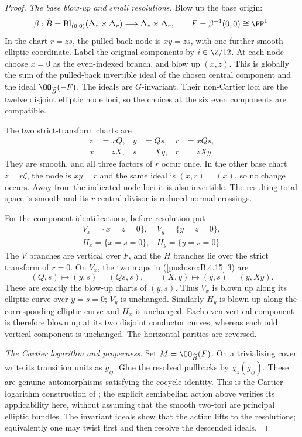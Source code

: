 \begin{proof}
\emph{The base blow-up and small resolutions.}
Blow up the base origin:
\[
 \beta:\widetilde B=\operatorname{Bl}_{(0,0)}
            (\Delta_z\times\Delta_r)
       \longrightarrow\Delta_z\times\Delta_r,
 \qquad F=\beta^{-1}(0,0)\cong\PP^1.
\]
In the chart $r=zs$, the pulled-back node is
$xy=zs$, with one further smooth elliptic coordinate.
Label the original components by $i\in\Z/12$.
At each node choose $x=0$ as the even-indexed branch,
and blow up $(x,z)$. This is globally the sum of the
pulled-back invertible ideal of the chosen central
component and the ideal $\OO_{\widetilde B}(-F)$.
The ideals are $G$-invariant. Their non-Cartier loci are
the twelve disjoint elliptic node loci, so the choices
at the six even components are compatible.

The two strict-transform charts are
\[
 \begin{aligned}
 z&=xQ,&y&=Qs,&r&=xQs,\\
 x&=zX,&s&=Xy,&r&=zXy.
 \end{aligned}
 \tag{B.4.15.3}
\]
They are smooth, and all three factors of $r$ occur once.
In the other base chart $z=r\zeta$, the node is $xy=r$
and the same ideal is $(x,r)=(x)$, so no change occurs.
Away from the indicated node loci it is also invertible.
The resulting total space is smooth and its $r$-central
divisor is reduced normal crossings.

For the component identifications, before resolution put
\[
 \begin{array}{ll}
 V_x=\{x=z=0\},&V_y=\{y=z=0\},\\
 H_x=\{x=s=0\},&H_y=\{y=s=0\}.
 \end{array}
\]
The $V$ branches are vertical over $F$, and the $H$
branches lie over the strict transform of $r=0$.
On $V_x$, the two maps in (\ref{push:src:B.4.15}.3) are
\[
 (Q,s)\longmapsto(y,s)=(Qs,s),\qquad
 (X,y)\longmapsto(y,s)=(y,Xy).
\]
These are exactly the blow-up charts of $(y,s)$.
Thus $V_x$ is blown up along its elliptic curve over
$y=s=0$; $V_y$ is unchanged. Similarly $H_y$ is blown
up along the corresponding elliptic curve and $H_x$
is unchanged. Each even vertical component is therefore
blown up at its two disjoint conductor curves, whereas
each odd vertical component is unchanged. The horizontal
parities are reversed.

\emph{The Cartier logarithm and properness.}
Set $M=\OO_{\widetilde B}(F)$. On a trivializing cover
write its transition units as $g_{ij}$. Glue the resolved
pullbacks by $\chi_z(g_{ij})$. These are genuine
automorphisms satisfying the cocycle identity.
This is the Cartier-logarithm construction of
\citet[Definition~1.1]{Fujimoto1990AB}; the explicit
semiabelian action above verifies its applicability
here, without assuming that the smooth two-tori are
principal elliptic bundles. The invariant ideals show
that the action lifts to the resolutions; equivalently
one may twist first and then resolve the descended ideals.


\end{proof}
